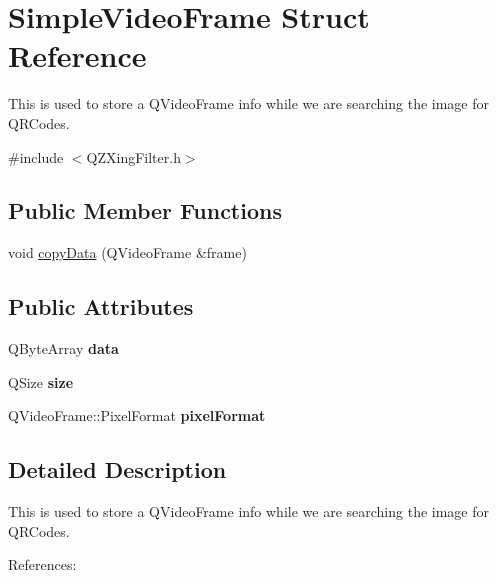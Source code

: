 \hypertarget{struct_simple_video_frame}{}\section{Simple\+Video\+Frame Struct Reference}
\label{struct_simple_video_frame}


This is used to store a Q\+Video\+Frame info while we are searching the image for Q\+R\+Codes.  




{\ttfamily \#include $<$Q\+Z\+Xing\+Filter.\+h$>$}

\subsection*{Public Member Functions}
\begin{DoxyCompactItemize}
\item 
void \mbox{\hyperlink{struct_simple_video_frame_a6e6bff50e72a9b5e424038d482e41475}{copy\+Data}} (Q\+Video\+Frame \&frame)
\end{DoxyCompactItemize}
\subsection*{Public Attributes}
\begin{DoxyCompactItemize}
\item 
\mbox{\label{struct_simple_video_frame_afd673f669348f2a833b5eef6eeea284a}} 
Q\+Byte\+Array {\bfseries data}
\item 
\mbox{\label{struct_simple_video_frame_a948d695bd81d5d26e181fcfa635a311d}} 
Q\+Size {\bfseries size}
\item 
\mbox{\label{struct_simple_video_frame_a322355a91acdf950d5cfdb98ec438bea}} 
Q\+Video\+Frame\+::\+Pixel\+Format {\bfseries pixel\+Format}
\end{DoxyCompactItemize}


\subsection{Detailed Description}
This is used to store a Q\+Video\+Frame info while we are searching the image for Q\+R\+Codes. 

References\+:

